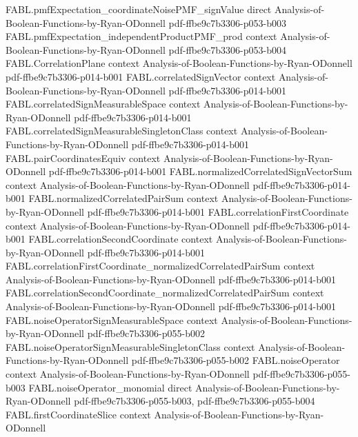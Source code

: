 \begin{theorem}
\proofstep
  {FABL.pmfExpectation_coordinateNoisePMF_signValue}
  {direct}
  {Analysis-of-Boolean-Functions-by-Ryan-ODonnell}
  {pdf-ffbe9c7b3306-p053-b003}
\proofstep
  {FABL.pmfExpectation_independentProductPMF_prod}
  {context}
  {Analysis-of-Boolean-Functions-by-Ryan-ODonnell}
  {pdf-ffbe9c7b3306-p053-b004}
\proofstep
  {FABL.CorrelationPlane}
  {context}
  {Analysis-of-Boolean-Functions-by-Ryan-ODonnell}
  {pdf-ffbe9c7b3306-p014-b001}
\proofstep
  {FABL.correlatedSignVector}
  {context}
  {Analysis-of-Boolean-Functions-by-Ryan-ODonnell}
  {pdf-ffbe9c7b3306-p014-b001}
\proofstep
  {FABL.correlatedSignMeasurableSpace}
  {context}
  {Analysis-of-Boolean-Functions-by-Ryan-ODonnell}
  {pdf-ffbe9c7b3306-p014-b001}
\proofstep
  {FABL.correlatedSignMeasurableSingletonClass}
  {context}
  {Analysis-of-Boolean-Functions-by-Ryan-ODonnell}
  {pdf-ffbe9c7b3306-p014-b001}
\proofstep
  {FABL.pairCoordinatesEquiv}
  {context}
  {Analysis-of-Boolean-Functions-by-Ryan-ODonnell}
  {pdf-ffbe9c7b3306-p014-b001}
\proofstep
  {FABL.normalizedCorrelatedSignVectorSum}
  {context}
  {Analysis-of-Boolean-Functions-by-Ryan-ODonnell}
  {pdf-ffbe9c7b3306-p014-b001}
\proofstep
  {FABL.normalizedCorrelatedPairSum}
  {context}
  {Analysis-of-Boolean-Functions-by-Ryan-ODonnell}
  {pdf-ffbe9c7b3306-p014-b001}
\proofstep
  {FABL.correlationFirstCoordinate}
  {context}
  {Analysis-of-Boolean-Functions-by-Ryan-ODonnell}
  {pdf-ffbe9c7b3306-p014-b001}
\proofstep
  {FABL.correlationSecondCoordinate}
  {context}
  {Analysis-of-Boolean-Functions-by-Ryan-ODonnell}
  {pdf-ffbe9c7b3306-p014-b001}
\proofstep
  {FABL.correlationFirstCoordinate_normalizedCorrelatedPairSum}
  {context}
  {Analysis-of-Boolean-Functions-by-Ryan-ODonnell}
  {pdf-ffbe9c7b3306-p014-b001}
\proofstep
  {FABL.correlationSecondCoordinate_normalizedCorrelatedPairSum}
  {context}
  {Analysis-of-Boolean-Functions-by-Ryan-ODonnell}
  {pdf-ffbe9c7b3306-p014-b001}
\proofstep
  {FABL.noiseOperatorSignMeasurableSpace}
  {context}
  {Analysis-of-Boolean-Functions-by-Ryan-ODonnell}
  {pdf-ffbe9c7b3306-p055-b002}
\proofstep
  {FABL.noiseOperatorSignMeasurableSingletonClass}
  {context}
  {Analysis-of-Boolean-Functions-by-Ryan-ODonnell}
  {pdf-ffbe9c7b3306-p055-b002}
\proofstep
  {FABL.noiseOperator}
  {context}
  {Analysis-of-Boolean-Functions-by-Ryan-ODonnell}
  {pdf-ffbe9c7b3306-p055-b003}
\proofstep
  {FABL.noiseOperator_monomial}
  {direct}
  {Analysis-of-Boolean-Functions-by-Ryan-ODonnell}
  {pdf-ffbe9c7b3306-p055-b003,
    pdf-ffbe9c7b3306-p055-b004}
\proofstep
  {FABL.firstCoordinateSlice}
  {context}
  {Analysis-of-Boolean-Functions-by-Ryan-ODonnell}

\end{theorem}
